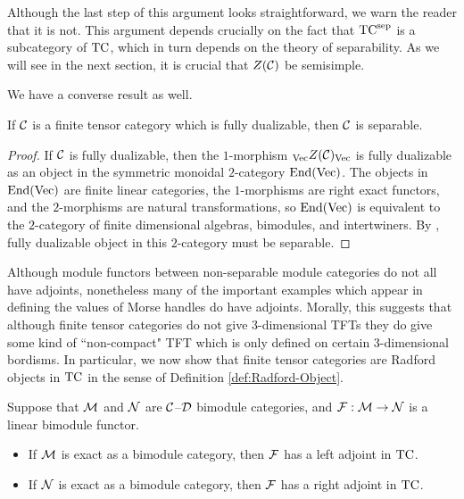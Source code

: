 \documentclass{amsart}
\begin{document}
\begin{warning}
Although the last step of this argument looks straightforward, we warn the reader that it is not.  This argument depends crucially on the fact that ${\mathrm{TC}^{\text{sep}}}$ is a subcategory of $\mathrm{TC}$, which in turn depends on the theory of separability.  As we will see in the next section, it is crucial that $Z(\mathcal C)$ be semisimple.
\end{warning}

We have a converse result as well.

\begin{theorem}
If $\mathcal C$ is a finite tensor category which is fully dualizable, then $\mathcal C$ is separable.
\end{theorem}
\begin{proof}
If $\mathcal C$ is fully dualizable, then the $1$-morphism ${}_{\mathrm{Vec}} Z(\mathcal C)_{\mathrm{Vec}}$ is fully dualizable as an object in the symmetric monoidal $2$-category $\operatorname{End}(\mathrm{Vec})$.  The objects in $\operatorname{End}(\mathrm{Vec})$ are finite linear categories, the $1$-morphisms are right exact functors, and the $2$-morphisms are natural transformations, so $\operatorname{End}(\mathrm{Vec})$ is equivalent to the $2$-category of finite dimensional algebras, bimodules, and intertwiners.  By \cite{???},  fully dualizable object in this $2$-category must be separable.
\end{proof}

Although module functors between non-separable module categories do not all have adjoints, nonetheless many of the important examples which appear in defining the values of Morse handles do have adjoints.  Morally, this suggests that although finite tensor categories do not give $3$-dimensional TFTs they do give some kind of ``non-compact" TFT which is only defined on certain $3$-dimensional bordisms.  In particular, we now show that finite tensor categories are Radford objects in $\mathrm{TC}$ in the sense of Definition \ref{def:Radford-Object}.

\begin{lemma}
Suppose that $\mathcal M$ and $\mathcal N$ are $\mathcal C$--$\mathcal D$ bimodule categories, and $\mathcal F: \mathcal M \rightarrow \mathcal N$ is a linear bimodule functor.
\begin{itemize}
\item If $\mathcal M$ is exact as a bimodule category, then $\mathcal F$ has a left adjoint in $\mathrm{TC}$.
\item If $\mathcal N$ is exact as a bimodule category, then $\mathcal F$ has a right adjoint in $\mathrm{TC}$.
\end{itemize}
\end{lemma}
\end{document}
